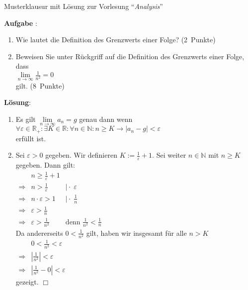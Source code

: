 \documentclass{article}
\newcounter{aufgabe}
\newcommand{\exercise}{\vspace*{0.3cm}
\stepcounter{aufgabe}

\noindent
\textbf{Aufgabe \arabic{aufgabe}}: }
\newcommand{\bruch}[2]{\displaystyle\frac{#1}{#2}}
\newcommand{\punkte}[1]{\hspace*{\fill} \mbox{(#1 Punkte)}}
\newcommand{\ds}{\displaystyle}
\newcommand{\qed}{\hspace*{\fill} $\Box$}
\newcommand{\solution}{\vspace*{0.2cm}

\noindent
\textbf{L\"osung}: }
\begin{document}
\noindent
{\large  Musterklausur mit L\"osung zur Vorlesung  ``{\sl Analysis}''}
\vspace{0.5cm}

\exercise
\begin{enumerate}
\item Wie lautet die Definition des Grenzwerts einer Folge? 
      \punkte{2}
\item Beweisen Sie unter R\"uckgriff auf die Definition des Grenzwerts einer Folge, dass 
      \\[0.2cm]
      \hspace*{1.3cm}
      $\ds \lim\limits_{n \rightarrow \infty} \frac{1}{n^2} = 0$
      \\[0.2cm]
      gilt.  
      \punkte{8}
\end{enumerate}

\solution 
\begin{enumerate}
\item Es gilt $\lim\limits_{n \rightarrow \infty} a_n = g$ genau dann wenn
      \\[0.2cm]
      \hspace*{1.3cm}
      $\forall \varepsilon \in \mathbb{R}_+: \exists K \in \mathbb{R}: \forall n \in \mathbb{N}: n \geq K \rightarrow |a_n - g| < \varepsilon
      $
      \\[0.2cm]
      erf\"ullt ist.
\item Sei $ \varepsilon >  0$  gegeben.  Wir definieren $K := \bruch{1}{\varepsilon} + 1$.  
      Sei weiter $n \in \mathbb{N}$ mit $n \geq K$ gegeben.  Dann gilt:
      \\[0.2cm]
      \hspace*{1.3cm}
      $
      \begin{array}{cll}
                  & n \geq \bruch{1}{\varepsilon} + 1      \\[0.3cm] 
      \Rightarrow & n > \bruch{1}{\varepsilon} & \mid \cdot \;\varepsilon \\[0.3cm]
      \Rightarrow & n \cdot \varepsilon > 1       & \mid \cdot \;\bruch{1}{n} \\[0.3cm]
      \Rightarrow & \varepsilon > \bruch{1}{n}   & \\[0.4cm]
      \Rightarrow & \varepsilon > \bruch{1}{n^2} & \mbox{denn $\ds \frac{1}{n^2} < \frac{1}{n}$}
      \end{array}
      $
       \\[0.2cm]
       Da andererseits  $0 < \bruch{1}{n^2}$ gilt, haben wir insgesamt f\"ur alle $n > K$
       \\[0.2cm]
       \hspace*{1.3cm}
       $
       \begin{array}{cl}
                     & 0 < \bruch{1}{n^2} < \varepsilon              \\[0.4cm]
         \Rightarrow & \left|\bruch{1}{n^2}\right| < \varepsilon     \\[0.4cm]
         \Rightarrow & \left|\bruch{1}{n^2}-0\right| < \varepsilon
       \end{array}
       $
       \\[0.2cm]
       gezeigt. \qed
\end{enumerate}
\pagebreak
\end{document}
